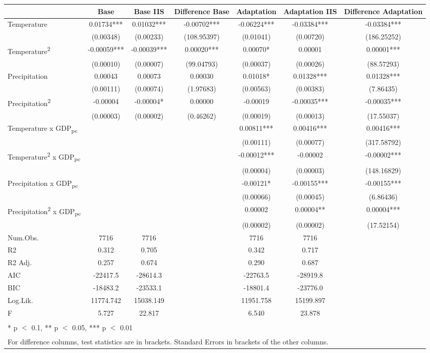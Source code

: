 \begin{table}
\centering
\begin{tabular}[t]{lcccccc}
\toprule
  & Base & Base IIS & Difference Base & Adaptation & Adaptation IIS & Difference Adaptation\\
\midrule
Temperature & 0.01734*** & 0.01032*** & -0.00702*** & -0.06224*** & -0.03384*** & -0.03384***\\
 & (0.00348) & (0.00233) & (108.95397) & (0.01041) & (0.00720) & (186.25252)\\
Temperature\textsuperscript{2} & -0.00059*** & -0.00039*** & 0.00020*** & 0.00070* & 0.00001 & 0.00001***\\
 & (0.00010) & (0.00007) & (99.04793) & (0.00037) & (0.00026) & (88.57293)\\
Precipitation & 0.00043 & 0.00073 & 0.00030 & 0.01018* & 0.01328*** & 0.01328***\\
 & (0.00111) & (0.00074) & (1.97683) & (0.00563) & (0.00383) & (7.86435)\\
Precipitation\textsuperscript{2} & -0.00004 & -0.00004* & 0.00000 & -0.00019 & -0.00035*** & -0.00035***\\
 & (0.00003) & (0.00002) & (0.46262) & (0.00019) & (0.00013) & (17.55037)\\
Temperature x GDP\textsubscript{pc} &  &  &  & 0.00811*** & 0.00416*** & 0.00416***\\
 &  &  &  & (0.00111) & (0.00077) & (317.58792)\\
Temperature\textsuperscript{2} x GDP\textsubscript{pc} &  &  &  & -0.00012*** & -0.00002 & -0.00002***\\
 &  &  &  & (0.00004) & (0.00003) & (148.16829)\\
Precipitation x GDP\textsubscript{pc} &  &  &  & -0.00121* & -0.00155*** & -0.00155***\\
 &  &  &  & (0.00066) & (0.00045) & (6.86436)\\
Precipitation\textsuperscript{2} x GDP\textsubscript{pc} &  &  &  & 0.00002 & 0.00004** & 0.00004***\\
 &  &  &  & (0.00002) & (0.00002) & (17.52154)\\
\midrule
Num.Obs. & 7716 & 7716 &  & 7716 & 7716 & \\
R2 & 0.312 & 0.705 &  & 0.342 & 0.717 & \\
R2 Adj. & 0.257 & 0.674 &  & 0.290 & 0.687 & \\
AIC & -22417.5 & -28614.3 &  & -22763.5 & -28919.8 & \\
BIC & -18483.2 & -23533.1 &  & -18801.4 & -23776.0 & \\
Log.Lik. & 11774.742 & 15038.149 &  & 11951.758 & 15199.897 & \\
F & 5.727 & 22.817 &  & 6.540 & 23.878 & \\
\bottomrule
\multicolumn{7}{l}{\textsuperscript{} * p $<$ 0.1, ** p $<$ 0.05, *** p $<$ 0.01}\\
\multicolumn{7}{l}{\textsuperscript{} For difference columns, test statistics are in brackets. Standard Errors in brackets of the other columns.}\\
\end{tabular}
\end{table}

